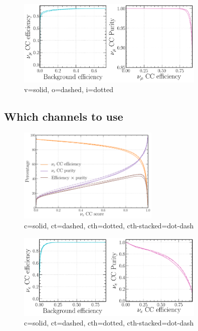 \begin{figure} %
    \includegraphics[width=0.8\textwidth]{diagrams/6-cvn/chipsnet/repr_numu_comp_curves.pdf}
    \caption[repr numu comp curves short]
    {v=solid, o=dashed, i=dotted}
    \label{fig:repr_numu_comp_curves}
\end{figure}

\subsection{Which channels to use} %
\label{sec:cvn_baseline_channel} %

\begin{figure} %
    \includegraphics[width=0.6\textwidth]{diagrams/6-cvn/chipsnet/channel_nuel_eff_curves.pdf}
    \caption[channel nuel eff curves short]
    {c=solid, ct=dashed, cth=dotted, cth-stacked=dot-dash}
    \label{fig:channel_nuel_eff_curves}
\end{figure}

\begin{figure} %
    \includegraphics[width=0.8\textwidth]{diagrams/6-cvn/chipsnet/channel_nuel_comp_curves.pdf}
    \caption[channel nuel comp curves short]
    {c=solid, ct=dashed, cth=dotted, cth-stacked=dot-dash}
    \label{fig:channel_nuel_comp_curves}
\end{figure}

